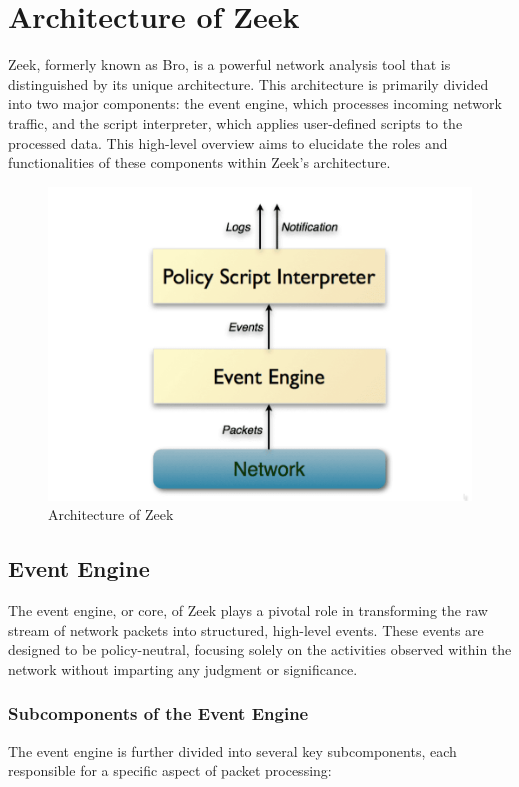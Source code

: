 \section{Architecture of Zeek}
Zeek, formerly known as Bro, is a powerful network analysis tool that is distinguished by its unique architecture. This architecture is primarily divided into two major components: the event engine, which processes incoming network traffic, and the script interpreter, which applies user-defined scripts to the processed data. This high-level overview aims to elucidate the roles and functionalities of these components within Zeek's architecture.

\begin{figure}[h]
    \centering
    \includegraphics[width=0.5\linewidth]{images/architecture.PNG}
    \caption{Architecture of Zeek}
    \label{fig:enter-label}
\end{figure}

\subsection{Event Engine}

The event engine, or core, of Zeek plays a pivotal role in transforming the raw stream of network packets into structured, high-level events. These events are designed to be policy-neutral, focusing solely on the activities observed within the network without imparting any judgment or significance.

\subsubsection{Subcomponents of the Event Engine}

The event engine is further divided into several key subcomponents, each responsible for a specific aspect of packet processing:

